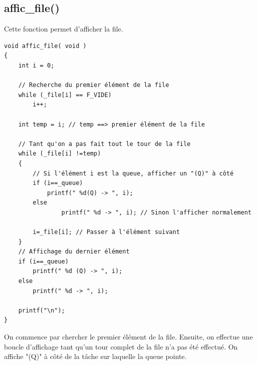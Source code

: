 \documentclass[a4paper,12pt]{report}
\begin{document}
\subsection{affic\_file()}
Cette fonction permet d'afficher la file.
\begin{lstlisting}
void affic_file( void )
{
	int i = 0;

	// Recherche du premier élément de la file
	while (_file[i] == F_VIDE) 
		i++;

	int temp = i; // temp ==> premier élément de la file

	// Tant qu'on a pas fait tout le tour de la file
	while (_file[i] !=temp) 
	{
		// Si l'élément i est la queue, afficher un "(Q)" à côté
		if (i==_queue)
			printf(" %d(Q) -> ", i); 
		else
				printf(" %d -> ", i); // Sinon l'afficher normalement
				
		i=_file[i]; // Passer à l'élément suivant
	}
	// Affichage du dernier élément
	if (i==_queue)
		printf(" %d (Q) -> ", i);
	else
		printf(" %d -> ", i);

	printf("\n");
}
\end{lstlisting}

On commence par chercher le premier élément de la file. Ensuite, on effectue une boucle d'affichage tant qu'un tour complet de la file n'a pas été effectué. On affiche "(Q)" à côté de la tâche sur laquelle la queue pointe.
\end{document}

